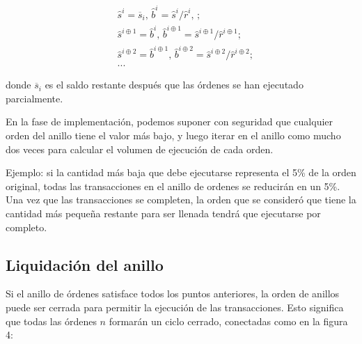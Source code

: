 \documentclass[UTF8,nofonts]{article}
\makeatletter
\newenvironment{figurehere}
 {\def\@captype{figure}}
 {}
\makeatother
\begin{document}
\begin{multicols}{2}
\[
\begin{split}
&\hat{s}^{i}=\overline{s}_i\text{, } \hat{b}^{i}=\hat{s}^{i}/ \hat{r}^i\text{, }\text{;}\\
&\hat{s}^{i\oplus 1}=\hat{b}^i\text{, } \hat{b}^{i\oplus 1}=\hat{s}^{i\oplus 1}/ \hat{r}^{i\oplus 1}\text{;}\\
&\hat{s}^{i\oplus 2}=\hat{b}^{i\oplus 1}\text{, } \hat{b}^{i\oplus 2}=\hat{s}^{i\oplus 2}/ \hat{r}^{i\oplus 2}\text{;}\\
& ...
\end{split}
\]

donde $\overline{s}_i$ es el saldo restante despu\'es que las \'ordenes se han ejecutado parcialmente.

En la fase de implementaci\'on, podemos suponer con seguridad que cualquier orden del anillo tiene el valor m\'as bajo, y luego iterar en el anillo como mucho dos veces para calcular el volumen de ejecuci\'on de cada orden.

Ejemplo: si la cantidad m\'as baja que debe ejecutarse representa el 5\% de la orden original, todas las transacciones en el anillo de ordenes se reducir\'an en un 5\%. Una vez que las transacciones se completen, la orden que se consider\'o que tiene la cantidad m\'as peque\~na restante para ser llenada tendr\'a que ejecutarse por completo.


\subsection{Liquidaci\'on del anillo\label{sec:settlement}}
Si el anillo de \'ordenes satisface todos los puntos anteriores, la orden de anillos puede ser cerrada para permitir la ejecuci\'on de las transacciones. Esto significa que todas las \'ordenes $n$ formar\'an un ciclo cerrado, conectadas como en la figura 4:

\begin{center}
\begin{figurehere}
\centering
{}
\end{figurehere}
\end{center}
\end{multicols}
\end{document}
